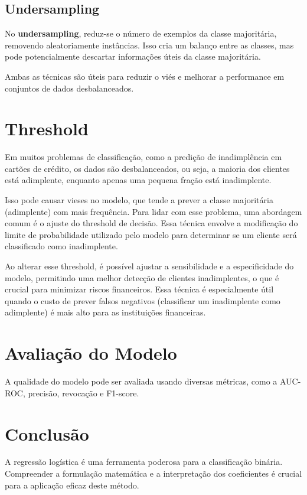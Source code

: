 \documentclass{abntpuc}
\begin{document}
\subsection{Undersampling}

No \textbf{undersampling}, reduz-se o número de exemplos da classe majoritária, removendo aleatoriamente instâncias. Isso cria um balanço entre as classes, mas pode potencialmente descartar informações úteis da classe majoritária.

Ambas as técnicas são úteis para reduzir o viés e melhorar a performance em conjuntos de dados desbalanceados.

\section{Threshold}

Em muitos problemas de classificação, como a predição de inadimplência em cartões de crédito, os dados são desbalanceados, ou seja, a maioria dos clientes está adimplente, enquanto apenas uma pequena fração está inadimplente.

Isso pode causar vieses no modelo, que tende a prever a classe majoritária (adimplente) com mais frequência. Para lidar com esse problema, uma abordagem comum é o ajuste do threshold de decisão. Essa técnica envolve a modificação do limite de probabilidade utilizado pelo modelo para determinar se um cliente será classificado como inadimplente.

Ao alterar esse threshold, é possível ajustar a sensibilidade e a especificidade do modelo, permitindo uma melhor detecção de clientes inadimplentes, o que é crucial para minimizar riscos financeiros. Essa técnica é especialmente útil quando o custo de prever falsos negativos (classificar um inadimplente como adimplente) é mais alto para as instituições financeiras.


\section{Avaliação do Modelo}
A qualidade do modelo pode ser avaliada usando diversas métricas, como a AUC-ROC, precisão, revocação e F1-score.

\section{Conclusão}
A regressão logística é uma ferramenta poderosa para a classificação binária. Compreender a formulação matemática e a interpretação dos coeficientes é crucial para a aplicação eficaz deste método.
\end{document}
